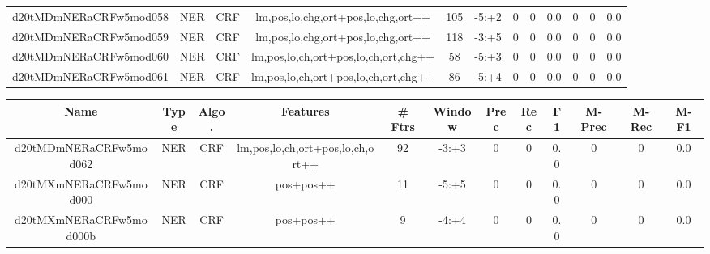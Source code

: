 \documentclass[a4paper]{article}
\begin{document}
\begin{landscape}
\begin{center}
\begin{tabular}{ |c|c|c|c|c|c|c|c|c|c|c|c|}
 
 	
 	\small{ d20tMDmNERaCRFw5mod058 } & \small{ NER} & \small{  CRF }  & lm,pos,lo,chg,ort+pos,lo,chg,ort++  &  105 &  \small{  -5:+2 }  &  0 & 0 & 0.0  &  0 & 0 & 0.0 \\
 	

 
 	
 	\small{ d20tMDmNERaCRFw5mod059 } & \small{ NER} & \small{  CRF }  & lm,pos,lo,chg,ort+pos,lo,chg,ort++  &  118 &  \small{  -3:+5 }  &  0 & 0 & 0.0  &  0 & 0 & 0.0 \\
 	

 
 	
 	\small{ d20tMDmNERaCRFw5mod060 } & \small{ NER} & \small{  CRF }  & lm,pos,lo,ch,ort+pos,lo,ch,ort,chg++  &  58 &  \small{  -5:+3 }  &  0 & 0 & 0.0  &  0 & 0 & 0.0 \\
 	

 
 	
 	\small{ d20tMDmNERaCRFw5mod061 } & \small{ NER} & \small{  CRF }  & lm,pos,lo,ch,ort+pos,lo,ch,ort,chg++  &  86 &  \small{  -5:+4 }  &  0 & 0 & 0.0  &  0 & 0 & 0.0 \\
 	
 \hline
\end{tabular}
\end{center}




\begin{center}
\begin{tabular}{ |c|c|c|c|c|c|c|c|c|c|c|c|} 
 \hline
 	Name & Type & Algo. & Features & \# Ftrs & Window & Prec & Rec & F1 & M-Prec & M-Rec & M-F1\\
 \hline

 	

 
 	
 	\small{ d20tMDmNERaCRFw5mod062 } & \small{ NER} & \small{  CRF }  & lm,pos,lo,ch,ort+pos,lo,ch,ort++  &  92 &  \small{  -3:+3 }  &  0 & 0 & 0.0  &  0 & 0 & 0.0 \\
 	

 
 	
 	\small{ d20tMXmNERaCRFw5mod000 } & \small{ NER} & \small{  CRF }  & pos+pos++  &  11 &  \small{  -5:+5 }  &  0 & 0 & 0.0  &  0 & 0 & 0.0 \\
 	

 
 	
 	\small{ d20tMXmNERaCRFw5mod000b } & \small{ NER} & \small{  CRF }  & pos+pos++  &  9 &  \small{  -4:+4 }  &  0 & 0 & 0.0  &  0 & 0 & 0.0 \\
 	


\end{tabular}
\end{center}
\end{landscape}
\end{document}
